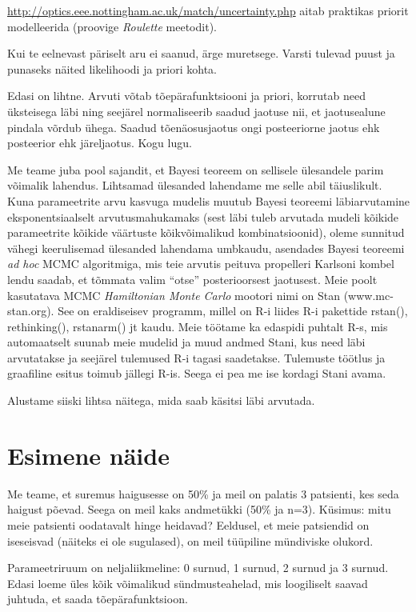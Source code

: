\documentclass[]{book}
\begin{document}
\url{http://optics.eee.nottingham.ac.uk/match/uncertainty.php} aitab praktikas priorit modelleerida (proovige \emph{Roulette} meetodit).

Kui te eelnevast päriselt aru ei saanud, ärge muretsege. Varsti tulevad puust ja punaseks näited likelihoodi ja priori kohta.

Edasi on lihtne. Arvuti võtab tõepärafunktsiooni ja priori, korrutab need üksteisega läbi ning seejärel normaliseerib saadud jaotuse nii, et jaotusealune pindala võrdub ühega. Saadud tõenäosusjaotus ongi posteeriorne jaotus ehk posteerior ehk järeljaotus. Kogu lugu.

Me teame juba pool sajandit, et Bayesi teoreem on sellisele ülesandele parim võimalik lahendus. Lihtsamad ülesanded lahendame me selle abil täiuslikult. Kuna parameetrite arvu kasvuga mudelis muutub Bayesi teoreemi läbiarvutamine eksponentsiaalselt arvutusmahukamaks (sest läbi tuleb arvutada mudeli kõikide parameetrite kõikide väärtuste kõikvõimalikud kombinatsioonid), oleme sunnitud vähegi keerulisemad ülesanded lahendama umbkaudu, asendades Bayesi teoreemi \emph{ad hoc} MCMC algoritmiga, mis teie arvutis peituva propelleri Karlsoni kombel lendu saadab, et tõmmata valim ``otse'' posterioorsest jaotusest. Meie poolt kasutatava MCMC \emph{Hamiltonian Monte Carlo} mootori nimi on Stan (www.mc-stan.org). See on eraldiseisev programm, millel on R-i liides R-i pakettide rstan(), rethinking(), rstanarm() jt kaudu. Meie töötame ka edaspidi puhtalt R-s, mis automaatselt suunab meie mudelid ja muud andmed Stani, kus need läbi arvutatakse ja seejärel tulemused R-i tagasi saadetakse. Tulemuste töötlus ja graafiline esitus toimub jällegi R-is. Seega ei pea me ise kordagi Stani avama.

Alustame siiski lihtsa näitega, mida saab käsitsi läbi arvutada.

\hypertarget{esimene-naide}{%
\section*{Esimene näide}\label{esimene-naide}}

Me teame, et suremus haigusesse on 50\% ja meil on palatis 3 patsienti, kes seda haigust põevad.
Seega on meil kaks andmetükki (50\% ja n=3).
Küsimus: mitu meie patsienti oodatavalt hinge heidavad? Eeldusel, et meie patsiendid on iseseisvad (näiteks ei ole sugulased), on meil tüüpiline mündiviske olukord.

Parameetriruum on neljaliikmeline: 0 surnud, 1 surnud, 2 surnud ja 3 surnud.
Edasi loeme üles kõik võimalikud sündmusteahelad, mis loogiliselt saavad juhtuda, et saada tõepärafunktsioon.
\end{document}
